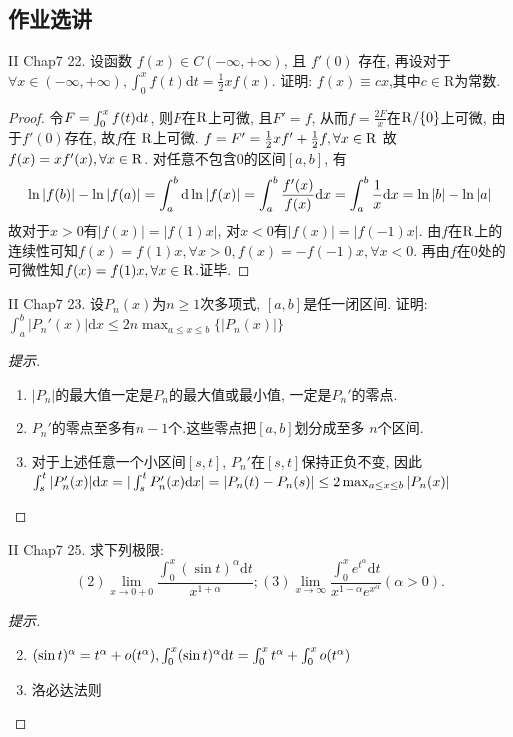 \documentclass[a4paper,12pt]{article}
\begin{document}
\subsection*{作业选讲}

\noindent II Chap7 22. 设函数 $f(x)\in C(-\infty,+\infty)$, 且 $f'(0)$ 存在, 再设对于
$\forall x\in(-\infty,+\infty),\int_0^xf(t)\mathrm{d}t=\frac{1}{2}xf(x)$.
证明: $f(x)\equiv cx$,其中$c\in\mathrm{R}$为常数.
\begin{proof}
  令$F=\int_0^xf(t)\mathrm{d} t$, 则$F$在$\mathrm{R}$上可微, 且$F'=f$,
  从而$f=\frac{2F}{x}$在$\mathrm{R}/\{0\}$上可微, 由于$f'(0)$存在, 故$f$在
  $\mathrm{R}$上可微. $f=F'=\frac{1}{2}xf'+\frac{1}{2}f, \forall x\in\mathrm{R}$
  故$f(x)=xf'(x),\forall x\in\mathrm{R}$. 对任意不包含$0$的区间$[a,b]$, 有
  \[\ln |f(b)|-\ln |f(a)|=\int_a^b\mathrm{d} \ln |f(x)|=\int_a^b\frac{f'(x)}{f(x)}\mathrm{d} x=\int_a^b\frac{1}{x}\mathrm{d} x=\ln |b|-\ln |a|\]
  故对于$x>0$有$|f(x)|=|f(1)x|$, 对$x<0$有$|f(x)|=|f(-1)x|$. 由$f$在$\mathrm{R}$上的连续性可知$f(x)=f(1)x,\forall x>0,f(x)=-f(-1)x,\forall x<0$. 再由$f$在$0$处的可微性知$f(x)=f(1)x,\forall x\in\mathrm{R}$.证毕.
\end{proof}

\noindent II Chap7 23. 设$P_n(x)$为$n\geq1$次多项式, $[a,b]$是任一闭区间. 证明:
\(\int_a^b|P_n'(x)|\mathrm{d}x\leq2n\max_{a\leq x\leq b}\{|P_n(x)|\}\)
\begin{proof}[提示]
  \ 
  \begin{enumerate}
    \item $|P_n|$的最大值一定是$P_n$的最大值或最小值, 一定是$P_n'$的零点.
    \item $P_n'$的零点至多有$n-1$个.这些零点把$[a,b]$划分成至多
      $n$个区间.
    \item 对于上述任意一个小区间$[s,t]$, $P_n'$在$[s,t]$保持正负不变, 因此$\int_s^t|P_n'(x)|\mathrm{d} x=|\int_s^tP_n'(x)\mathrm{d} x|=|P_n(t)-P_n(s)|\leq 2\max_{a\leq x\leq b}|P_n(x)|$
  \end{enumerate}
\end{proof}

\noindent II Chap7 25. 求下列极限:
\[
(2)\lim_{x\to0+0}\frac{\int_0^x(\sin t)^\alpha\mathrm{d}t}{x^{1+\alpha}};
(3)\lim_{x\to\infty}\frac{\int_0^xe^{t^\alpha}\mathrm{d}t}{x^{1-\alpha}e^{x^\alpha}}(\alpha>0).
\]
\begin{proof}[提示]
  \ 
  \begin{enumerate}
    \setcounter{enumi}{1}
  \item $(\sin t)^\alpha=t^\alpha+o(t^\alpha), \int_0^x(\sin t)^\alpha\mathrm{d} t=\int_0^xt^\alpha+\int_0^xo(t^\alpha)$
    \item 洛必达法则
  \end{enumerate}
\end{proof}
\end{document}
